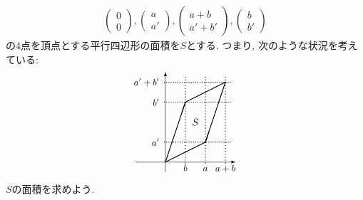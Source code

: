 \begin{remark}
  \label{thm:det:geommeaning}
  \begin{align*}
  \begin{pmatrix}
    0\\0
  \end{pmatrix},
  \begin{pmatrix}
    a\\a'
  \end{pmatrix},
  \begin{pmatrix}
    a+b\\a'+b'
  \end{pmatrix},
  \begin{pmatrix}
    b\\b'
  \end{pmatrix}
  \end{align*}
  の$4$点を頂点とする平行四辺形の面積を$S$とする.
  つまり, 次のような状況を考えている:
  \begin{align*}
    \begin{picture}(100,100)
      \put(30,0){\vector(0,1){100}}
      \put(0,10){\vector(1,0){100}}
      \thicklines
      \put(30,10){\line(2,1){40}}
      \put(30,10){\line(1,3){20}}
      \put(90,90){\line(-2,-1){40}}
      \put(90,90){\line(-1,-3){20}}
      \qbezier[30](50,9)(50,53)(50,95)
      \qbezier[30](70,9)(70,53)(70,95)
      \qbezier[30](90,9)(90,53)(90,95)
      \qbezier[30](29,30)(63,30)(95,30)
      \qbezier[30](29,70)(63,70)(95,70)
      \qbezier[30](29,90)(63,90)(95,90)
      \put(50,1){\makebox(0,0)[b]{\small $b$}}
      \put(70,1){\makebox(0,0)[b]{\small $a$}}
      \put(90,0){\makebox(0,0)[b]{\small $a+b$}}
      \put(24,30){\makebox(0,0)[r]{\small $a'$}}
      \put(24,70){\makebox(0,0)[r]{\small $b'$}}
      \put(24,90){\makebox(0,0)[r]{\small $a'+b'$}}
      \put(60,50){\makebox(0,0){$S$}}
    \end{picture}
  \end{align*}
  $S$の面積を求めよう.


\end{remark}
